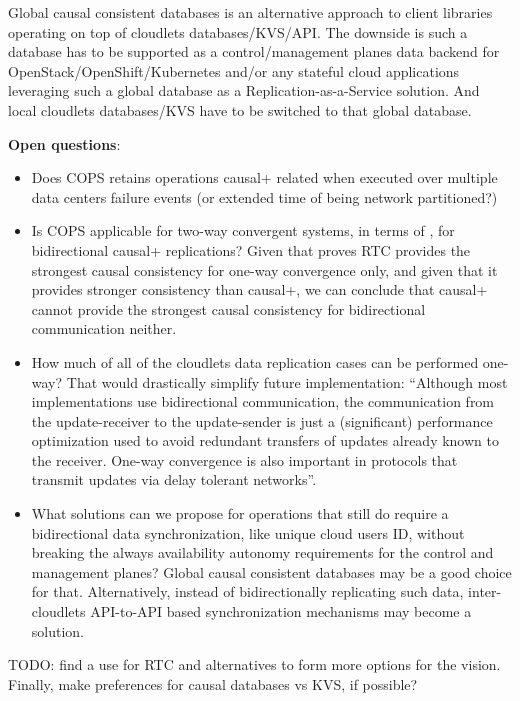 \documentclass[conference]{IEEEtran}
\begin{document}
Global causal consistent databases\cite{b6} is an alternative approach to
client libraries operating on top of cloudlets databases/KVS/API. The downside
is such a database has to be supported as a control/management planes data
backend for OpenStack/OpenShift/Kubernetes and/or any stateful cloud
applications leveraging such a global database as a Replication-as-a-Service
solution. And local cloudlets databases/KVS have to be switched to that global
database.

\textbf{Open questions}:
\begin{itemize}
  \item Does COPS retains operations causal+ related when executed over
    multiple data centers failure events (or extended time of being network
    partitioned?)
  \item Is COPS applicable for two-way convergent systems, in terms of
    \cite{b2}, for bidirectional causal+ replications? Given that\cite{b1}
    proves RTC provides the strongest causal consistency for one-way
    convergence only, and given that it provides stronger consistency than
    causal+, we can conclude that causal+ cannot provide the strongest causal
    consistency for bidirectional communication neither.
  \item How much of all of the cloudlets data replication cases can be
    performed one-way? That would drastically simplify future implementation:
    ``Although most implementations use bidirectional communication, the
    communication from the update-receiver to the update-sender is just a
    (significant) performance optimization used to avoid redundant transfers of
    updates already known to the receiver. One-way convergence is also
    important in protocols that transmit updates via delay tolerant
    networks''\cite{b2}.
  \item What solutions can we propose for operations that still do require a
    bidirectional data synchronization, like unique cloud users ID, without
    breaking the always availability autonomy requirements for the control
    and management planes? Global causal consistent databases may be
    a good choice for that. Alternatively, instead of bidirectionally
    replicating such data, inter-cloudlets API-to-API based synchronization
    mechanisms may become a solution.
\end{itemize}

TODO: find a use for RTC and\cite{b6} alternatives to form more
options for the vision. Finally, make preferences for causal databases vs KVS, if
possible?
\end{document}
